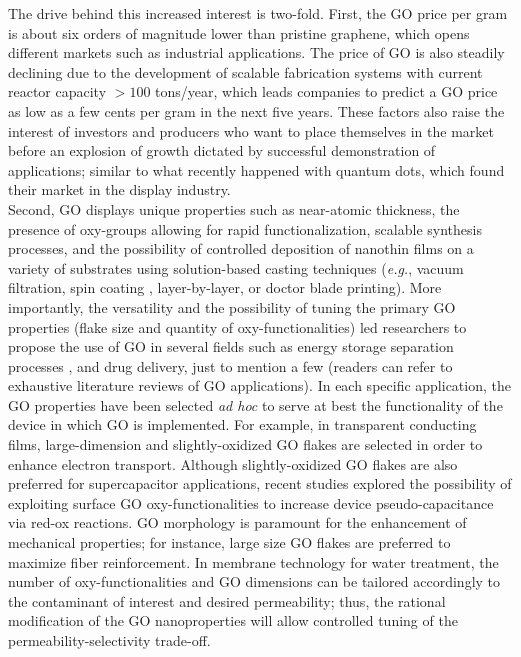 The drive behind this increased interest is two-fold. First, the GO price per gram is about six orders of magnitude lower than pristine graphene, which opens different markets such as industrial applications. The price of GO is also steadily declining due to the development of scalable fabrication systems with current reactor capacity $>100$ tons/year, which leads companies to predict a GO price as low as a few cents per gram in the next five years. These factors also raise the interest of investors and producers who want to place themselves in the market before an explosion of growth dictated by successful demonstration of applications; similar to what recently happened with quantum dots, which found their
market in the display industry.\cite{shirasaki2013emergence}\\
Second, GO displays unique properties such as near-atomic
thickness,\cite{novoselov2012} the presence of oxy-groups allowing for rapid functionalization,\cite{Dreyer2010} scalable synthesis processes,\cite{park2009chemical} and the possibility of controlled deposition of nanothin films on a variety of substrates using solution-based casting techniques (\textit{e.g.}, vacuum filtration,\cite{Han2013,nair2012unimpeded} spin coating ,\cite{shen2016subnanometer,wang2016dramatic} layer-by-layer,\cite{silverberg2017controlling} or doctor blade printing\cite{akbari2016large}). More importantly, the versatility and the possibility of tuning the primary GO properties (flake size and quantity of oxy-functionalities) led researchers to propose the use of GO in several fields such as energy storage \cite{ogata2017all,yoo2011ultrathin} separation processes ,\cite{wang2016dramatic,mi2014graphene,fathizadeh2017graphene} and drug delivery,\cite{liu2013graphene,wang2014reduced} just to mention a few (readers can refer to exhaustive literature reviews of GO applications).\cite{georgakilas2016noncovalent} In each specific application, the GO properties have been selected \textit{ad hoc} to serve at best the functionality of the device in which GO is implemented. For example, in transparent conducting films, large-dimension and slightly-oxidized GO flakes are selected in order to enhance electron transport.\cite{mattevi2009evolution,eda2008large}  Although slightly-oxidized GO flakes are also preferred for supercapacitor applications, recent studies explored the possibility of exploiting surface GO oxy-functionalities to increase device pseudo-capacitance via red-ox reactions.\cite{jana2015non} GO morphology is paramount for the enhancement of mechanical properties; for instance, large size GO flakes are preferred to maximize fiber reinforcement.\cite{cano2013improving} In membrane technology for water treatment, the number of oxy-functionalities and GO dimensions can be tailored accordingly to the contaminant of interest and desired permeability;\cite{mi2014graphene} thus, the rational modification of the GO nanoproperties will allow controlled tuning of the permeability-selectivity trade-off.\\
